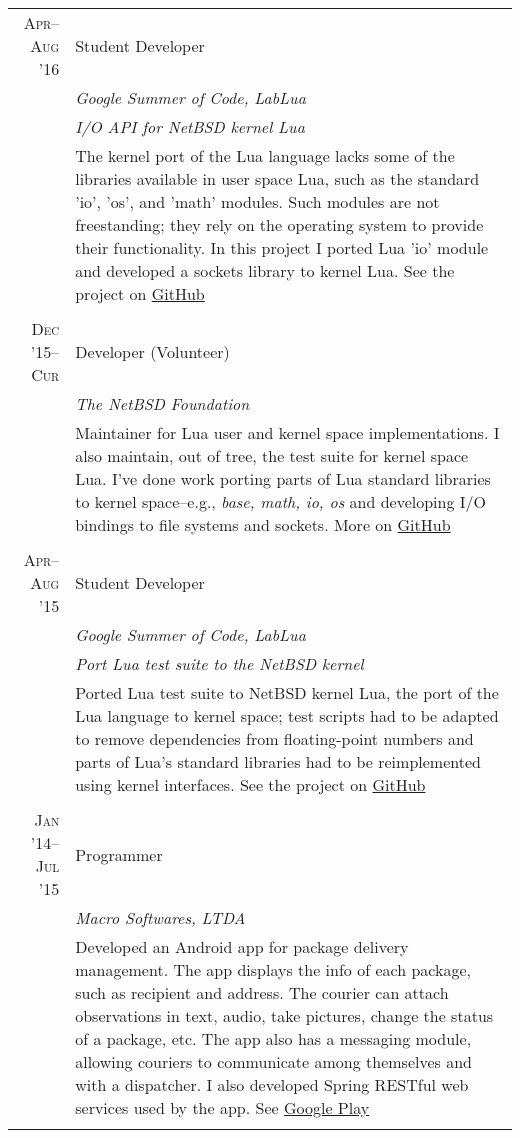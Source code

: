 \documentclass[a4paper,10pt]{article}
\begin{document}
\begin{longtable}{r|p{11cm}}

  \textsc{Apr--Aug '16} & Student Developer \\
  &\emph{Google Summer of Code, LabLua}\\
  &\emph{\footnotesize{I/O API for NetBSD kernel Lua}}\\
  &\footnotesize{The kernel port of the Lua language lacks some of the libraries
  available in user space Lua, such as the standard 'io', 'os', and 'math' modules. 
  Such modules are not freestanding; they rely on the operating system to provide
  their functionality. In this project I ported Lua 'io' module and developed a 
  sockets library to kernel Lua. See the project on 
  \href{https://GitHub.com/salazar/luaio}{GitHub}}
  \\\multicolumn{2}{c}{} \\

  \textsc{Dec '15--Cur}
  & Developer (Volunteer)\\
  &\emph{The NetBSD Foundation}\\
  &\footnotesize{Maintainer for Lua user and kernel space implementations. I
  also maintain, out of tree, the test suite for kernel space Lua. I've done
  work porting parts of Lua standard libraries to kernel space--e.g., \emph{base, 
  math, io, os} and developing I/O bindings to file systems and sockets. More 
  on \href{https://GitHub.com/salazar/netbsd}{GitHub}}
  \\\multicolumn{2}{c}{} \\
  
  \textsc{Apr--Aug '15}
  & Student Developer \\
  &\emph{Google Summer of Code, LabLua}\\
  &\emph{\footnotesize{Port Lua test
         suite to the NetBSD kernel}}\\
  &\footnotesize{Ported Lua test suite to NetBSD kernel Lua, the port of the Lua
  language to kernel space; test scripts
   had to be adapted to remove dependencies from floating-point numbers and parts
   of Lua's standard libraries had to be reimplemented using kernel interfaces.
   See the project on 
   \href{https://GitHub.com/salazar/luatests}{GitHub}}
  \\\multicolumn{2}{c}{} \\

  \textsc{Jan '14--Jul '15}
  & Programmer \\
  &\emph{Macro Softwares, LTDA}\\
  &\footnotesize{Developed an Android app for package delivery management. The
  app displays the info of each package, such as recipient and address.
  The courier can attach observations in text, audio, take pictures,
  change the status of a package, etc. The app also has a messaging module,
  allowing couriers to communicate among themselves and with a dispatcher. 
  I also developed Spring RESTful web services used by the app. See 
  \href{https://play.google.com/store/apps/details?id=br.com.entregadoronline}{Google Play}} \\
  \multicolumn{2}{c}{} \\


\end{longtable}
\end{document}
